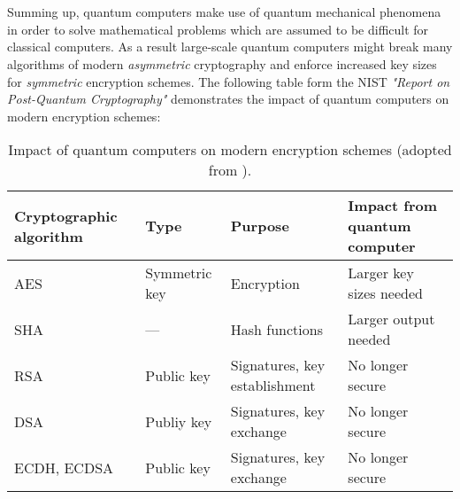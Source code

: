 \\\\
Summing up, quantum computers make use of quantum mechanical phenomena in order to solve mathematical problems which are assumed to be difficult for classical computers. As a result large-scale quantum computers might break many algorithms of modern \textit{asymmetric} cryptography and enforce increased key sizes for \textit{symmetric} encryption schemes. The following table form the \gls{NIST} \textit{"Report on Post-Quantum Cryptography"} \parencite{chen2016report} demonstrates the impact of quantum computers on modern encryption schemes:

\begin{table}[H]
  \centering
  \begin{tabular}{|K{3cm}|K{3cm}|K{4cm}|K{4cm}|}
	\hline
      \textbf{Cryptographic} \textbf{algorithm} & \textbf{Type} & \textbf{Purpose} & \textbf{Impact from} \textbf{ quantum computer} \\
	\hline
      \gls{AES} & Symmetric key & Encryption & Larger key sizes needed \\
    \hline
      \gls{SHA} & --- & Hash functions & Larger output needed \\
    \hline
      \gls{RSA} & Public key & Signatures, key establishment & No longer secure \\
	\hline      
      \gls{DSA} & Publiy key & Signatures, key exchange & No longer secure \\
    \hline
      \gls{ECDH}, \gls{ECDSA} & Public key & Signatures, key exchange & No longer secure \\
    \hline
  \end{tabular}
  \caption[Impact of quantum computers on modern encryption schemes]{Impact of quantum computers on modern encryption schemes (adopted from \parencite{chen2016report}).}\label{tab:impact}
\end{table}

